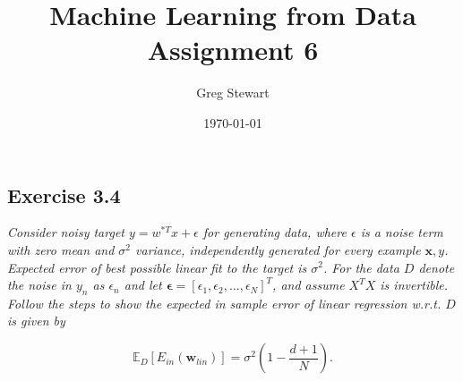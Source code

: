 \documentclass{article}
\title{Machine Learning from Data Assignment 6}
\author{Greg Stewart}
\date{\today}
\renewcommand{\vec}[1]{\mathbf{#1}}
\begin{document}
\maketitle

\subsection*{Exercise 3.4}

\textit{Consider noisy target $y=w^{*T}x + \epsilon$ for generating data, where $\epsilon$ is a
noise term with zero mean and $\sigma^2$ variance, independently generated for every example
$\vec{x},y$. Expected error of best possible linear fit to the target is $\sigma^2$.
For the data $D$ denote the noise in $y_n$ as $\epsilon_n$ and let $\vec{\epsilon} = [\epsilon_1,
\epsilon_2, \dots, \epsilon_N]^T$, and assume $X^TX$ is invertible. Follow the steps to show the expected in sample error of linear regression w.r.t. $D$ is given by}

$$\mathbb{E}_D[E_{in}(\vec{w}_{lin})] = \sigma^2 (1 - \frac{d+1}{N}).$$
\end{document}
